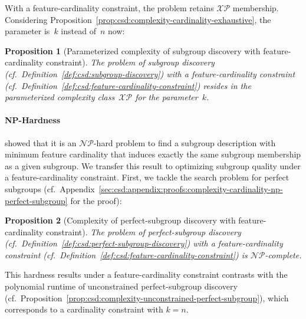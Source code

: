 \documentclass{article}
\newtheorem{proposition}{Proposition}
\theoremstyle{definition}
\begin{document}
With a feature-cardinality constraint, the problem retains $\mathcal{XP}$ membership.
Considering Proposition~\ref{prop:csd:complexity-cardinality-exhaustive}, the parameter is~$k$ instead of~$n$ now:
%
\begin{proposition}[Parameterized complexity of subgroup discovery with feature-cardinality constraint]
	The problem of subgroup discovery (cf.~Definition~\ref{def:csd:subgroup-discovery}) with a feature-cardinality constraint (cf.~Definition~\ref{def:csd:feature-cardinality-constraint}) resides in the parameterized complexity class~$\mathcal{XP}$ for the parameter~$k$.
	\label{prop:csd:complexity-cardinality-xp}
\end{proposition}

\paragraph{NP-Hardness}

\cite{boley2009non} showed that it is an $\mathcal{NP}$-hard problem to find a subgroup description with minimum feature cardinality that induces exactly the same subgroup membership as a given subgroup.
We transfer this result to optimizing subgroup quality under a feature-cardinality constraint.
First, we tackle the search problem for perfect subgroups (cf.~Appendix~\ref{sec:csd:appendix:proofs:complexity-cardinality-np-perfect-subgroup} for the proof):
%
\begin{proposition}[Complexity of perfect-subgroup discovery with feature-cardinality constraint]
	 The problem of perfect-subgroup discovery (cf.~Definition~\ref{def:csd:perfect-subgroup-discovery}) with a feature-cardinality constraint (cf.~Definition~\ref{def:csd:feature-cardinality-constraint}) is $\mathcal{NP}$-complete.
	\label{prop:csd:complexity-cardinality-np-perfect-subgroup}
\end{proposition}
%
This hardness results under a feature-cardinality constraint contrasts with the polynomial runtime of unconstrained perfect-subgroup discovery (cf.~Proposition~\ref{prop:csd:complexity-unconstrained-perfect-subgroup}), which corresponds to a cardinality constraint with $k = n$.
\end{document}
